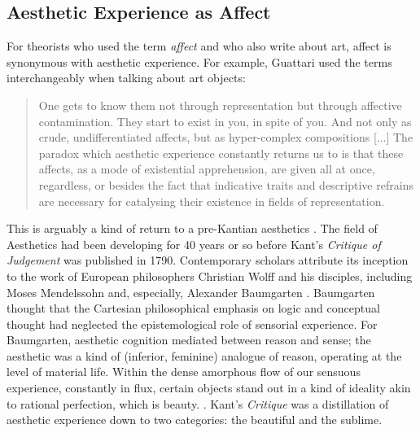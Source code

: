     \subsection{Aesthetic Experience as Affect}\label{sec:AestheticExperienceAsAffect}

        For theorists who used the term \emph{affect} and who also write about art, affect is synonymous with aesthetic experience. For example, Guattari used the terms interchangeably when talking about art objects:

        \begin{quote}
            One gets to know them not through representation but through affective contamination. They start to exist in you, in spite of you. And not only as crude, undifferentiated affects, but as hyper-complex compositions [...] The paradox which aesthetic experience constantly returns us to is that these affects, as a mode of existential apprehension, are given all at once, regardless, or besides the fact that indicative traits and descriptive refrains are necessary for catalysing their existence in fields of representation. \citep[pp. 92-93]{GuattariChsmss1995}
        \end{quote}

        This is arguably a kind of return to a pre-Kantian aesthetics \citep[p.121]{HighmoreBttrAftrTst2010}. The field of Aesthetics had been developing for 40 years or so before Kant's \emph{Critique of Judgement} was published in 1790. Contemporary scholars attribute its inception to the work of European philosophers Christian Wolff and his disciples, including Moses Mendelssohn and, especially, Alexander Baumgarten \citep[pp.327-338]{EagletonFrPrtclrs1990}. Baumgarten thought that the Cartesian philosophical emphasis on logic and conceptual thought had neglected the epistemological role of sensorial experience. For Baumgarten, aesthetic cognition mediated between reason and sense; the aesthetic was a kind of (inferior, feminine) analogue of reason, operating at the level of material life. Within the dense amorphous flow of our sensuous experience, constantly in flux, certain objects stand out in a kind of ideality akin to rational perfection, which is beauty. \citep[p.328]{EagletonFrPrtclrs1990}. Kant's \emph{Critique} was a distillation of aesthetic experience down to two categories: the beautiful and the sublime.
        
